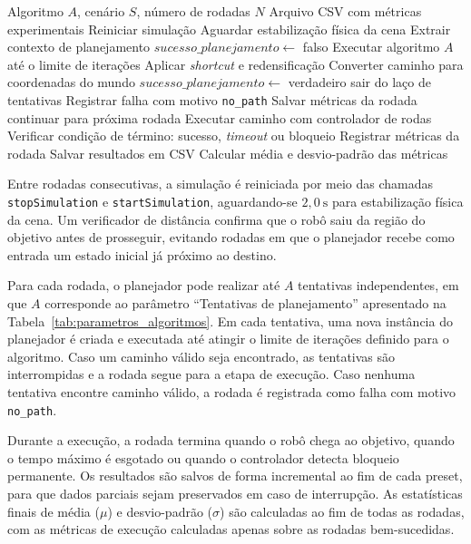 \begin{algorithm}[H]
\caption{Protocolo experimental por algoritmo e cenário}
\label{alg:protocolo_experimental}
\begin{algorithmic}[1]
\Require Algoritmo $A$, cenário $S$, número de rodadas $N$
\Ensure Arquivo CSV com métricas experimentais
    \State Reiniciar simulação
    \State Aguardar estabilização física da cena
    \State Extrair contexto de planejamento
    \State $sucesso\_planejamento \gets$ falso
        \State Executar algoritmo $A$ até o limite de iterações
            \State Aplicar \textit{shortcut} e redensificação
            \State Converter caminho para coordenadas do mundo
            \State $sucesso\_planejamento \gets$ verdadeiro
            \State sair do laço de tentativas
        \EndIf
    \EndFor
        \State Registrar falha com motivo \texttt{no\_path}
        \State Salvar métricas da rodada
        \State continuar para próxima rodada
    \EndIf
    \State Executar caminho com controlador de rodas
    \State Verificar condição de término: sucesso, \textit{timeout} ou bloqueio
    \State Registrar métricas da rodada
    \State Salvar resultados em CSV
\EndFor
\State Calcular média e desvio-padrão das métricas
\end{algorithmic}
\end{algorithm}

Entre rodadas consecutivas, a simulação é reiniciada por meio das chamadas \texttt{stopSimulation} e \texttt{startSimulation}, aguardando-se $2{,}0~\text{s}$ para estabilização física da cena. Um verificador de distância confirma que o robô saiu da região do objetivo antes de prosseguir, evitando rodadas em que o planejador recebe como entrada um estado inicial já próximo ao destino.

Para cada rodada, o planejador pode realizar até $A$ tentativas independentes, em que $A$ corresponde ao parâmetro ``Tentativas de planejamento'' apresentado na Tabela~\ref{tab:parametros_algoritmos}. Em cada tentativa, uma nova instância do planejador é criada e executada até atingir o limite de iterações definido para o algoritmo. Caso um caminho válido seja encontrado, as tentativas são interrompidas e a rodada segue para a etapa de execução. Caso nenhuma tentativa encontre caminho válido, a rodada é registrada como falha com motivo \texttt{no\_path}.

Durante a execução, a rodada termina quando o robô chega ao objetivo, quando o tempo máximo é esgotado ou quando o controlador detecta bloqueio permanente. Os resultados são salvos de forma incremental ao fim de cada preset, para que dados parciais sejam preservados em caso de interrupção. As estatísticas finais de média ($\mu$) e desvio-padrão ($\sigma$) são calculadas ao fim de todas as rodadas, com as métricas de execução calculadas apenas sobre as rodadas bem-sucedidas.
